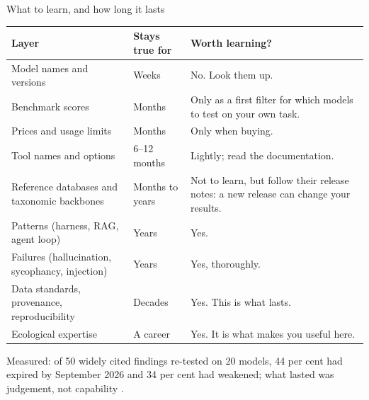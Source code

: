 \documentclass[11pt,aspectratio=169]{beamer}
\begin{document}
\begin{frame}{What to learn, and how long it lasts}
  \scriptsize
  \begin{tabularx}{\textwidth}{XlX}
    \toprule
    \textbf{Layer} & \textbf{Stays true for} & \textbf{Worth learning?} \\
    \midrule
    Model names and versions & Weeks & No. Look them up. \\
    Benchmark scores & Months & Only as a first filter for which models to test on your own task. \\
    Prices and usage limits & Months & Only when buying. \\
    Tool names and options & 6--12 months & Lightly; read the documentation. \\
    Reference databases and taxonomic backbones & Months to years & Not to learn, but follow their release notes: a new release can change your results. \\
    Patterns (harness, RAG, agent loop) & Years & Yes. \\
    Failures (hallucination, sycophancy, injection) & Years & Yes, thoroughly. \\
    Data standards, provenance, reproducibility & Decades & Yes. This is what lasts. \\
    Ecological expertise & A career & Yes. It is what makes you useful here. \\
    \bottomrule
  \end{tabularx}
  {\scriptsize Measured: of 50 widely cited findings re-tested on 20 models, 44
    per cent had expired by September 2026 and 34 per cent had weakened; what
    lasted was judgement, not capability \parencite{queen2026shelflife}.\par}
\end{frame}
\end{document}
